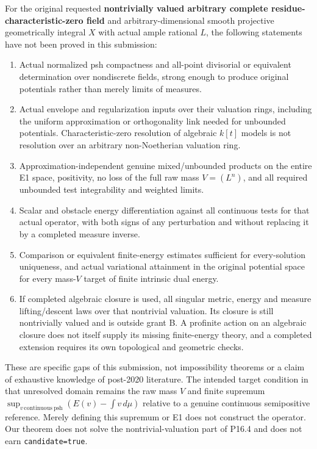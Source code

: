 \documentclass[
  11pt,
]{article}
\providecommand{\tightlist}{%
  \setlength{\itemsep}{0pt}\setlength{\parskip}{0pt}}
\begin{document}
For the original requested \textbf{nontrivially valued arbitrary
complete residue-characteristic-zero field} and arbitrary-dimensional
smooth projective geometrically integral \(X\) with actual ample
rational \(L\), the following statements have not been proved in this
submission:

\begin{enumerate}
\def\labelenumi{\arabic{enumi}.}
\tightlist
\item
  Actual normalized psh compactness and all-point divisorial or
  equivalent determination over nondiscrete fields, strong enough to
  produce original potentials rather than merely limits of measures.
\item
  Actual envelope and regularization inputs over their valuation rings,
  including the uniform approximation or orthogonality link needed for
  unbounded potentials. Characteristic-zero resolution of algebraic
  \(k[t]\) models is not resolution over an arbitrary non-Noetherian
  valuation ring.
\item
  Approximation-independent genuine mixed/unbounded products on the
  entire E1 space, positivity, no loss of the full raw mass \(V=(L^n)\),
  and all required unbounded test integrability and weighted limits.
\item
  Scalar and obstacle energy differentiation against all continuous
  tests for that actual operator, with both signs of any perturbation
  and without replacing it by a completed measure inverse.
\item
  Comparison or equivalent finite-energy estimates sufficient for
  every-solution uniqueness, and actual variational attainment in the
  original potential space for every mass-\(V\) target of finite
  intrinsic dual energy.
\item
  If completed algebraic closure is used, all singular metric, energy
  and measure lifting/descent laws over that nontrivial valuation. Its
  closure is still nontrivially valued and is outside grant B. A
  profinite action on an algebraic closure does not itself supply its
  missing finite-energy theory, and a completed extension requires its
  own topological and geometric checks.
\end{enumerate}

These are specific gaps of this submission, not impossibility theorems
or a claim of exhaustive knowledge of post-2020 literature. The intended
target condition in that unresolved domain remains the raw mass \(V\)
and finite supremum
\(\sup_{v\,\mathrm{continuous\ psh}}(E(v)-\int v\,d\mu)\) relative to a
genuine continuous semipositive reference. Merely defining this supremum
or E1 does not construct the operator. Our theorem does not solve the
nontrivial-valuation part of P16.4 and does not earn
\texttt{candidate=true}.
\end{document}
